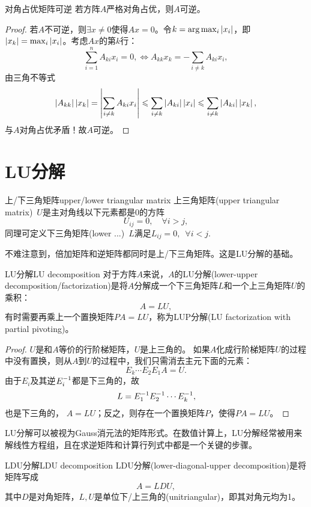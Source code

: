 \begin{theorem}
	{对角占优矩阵可逆}{}
	若方阵$A$严格对角占优，则$A$可逆。
\end{theorem}

\begin{proof}
	若$A$不可逆，则$\exists x\neq 0$使得$Ax=0$。令$k=\arg\max_i\left\lvert x_i\right\rvert$，即$\left\lvert x_k\right\rvert=\max_i\left\lvert x_i\right\rvert$。考虑$Ax$的第$k$行：
	\[
		\sum_{i=1}^nA_{ki}x_i=0,\iff A_{kk}x_k=-\sum_{i\neq k}A_{ki}x_i,
	\]
	由三角不等式
	\[
		\left\lvert A_{kk}\right\rvert\left\lvert x_k\right\rvert=\left\lvert\sum_{i\neq k}A_{ki}x_i\right\rvert\leqslant\sum_{i\neq k}\left\lvert A_{ki}\right\rvert\left\lvert x_i\right\rvert\leqslant\sum_{i\neq k}\left\lvert A_{ki}\right\rvert\left\lvert x_k\right\rvert,
	\]
	与$A$对角占优矛盾！故$A$可逆。
\end{proof}

\section{LU分解}

\begin{definition}{上/下三角矩阵}{upper/lower triangular matrix}
	上三角矩阵(upper triangular matrix)~$U$是主对角线以下元素都是0的方阵
	\[
		U_{ij}=0,\quad\forall i>j,
	\]
	同理可定义下三角矩阵(lower ...)~$L$满足$L_{ij}=0,\enspace\forall i<j.$
\end{definition}
不难注意到，倍加矩阵和逆矩阵都同时是上/下三角矩阵。这是LU分解的基础。
\begin{theorem}{LU分解}{LU decomposition}
	对于方阵$A$来说，$A$的LU分解(lower-upper decomposition/factorization)是将$A$分解成一个下三角矩阵$L$和一个上三角矩阵$U$的乘积：
	\begin{equation}
		A=LU,
	\end{equation}
	有时需要再乘上一个置换矩阵$PA=LU$，称为LUP分解(LU factorization with partial pivoting)。
\end{theorem}
\begin{proof}
	$U$是和$A$等价的行阶梯矩阵，$U$是上三角的。
	如果$A$化成行阶梯矩阵$U$的过程中没有置换，则从$A$到$U$的过程中，我们只需消去主元下面的元素：
	\[
		E_k\cdots E_2E_1A=U.
	\]
	由于$E_i$及其逆$E_i^{-1}$都是下三角的，故
	\[
		L=E_1^{-1} E_2^{-1}\cdots E_k^{-1},
	\]
	也是下三角的，%
	$A=LU$；反之，则存在一个置换矩阵$P$，使得$PA=LU$。
\end{proof}

\begin{remark}
	LU分解可以被视为Gauss消元法的矩阵形式。在数值计算上，LU分解经常被用来解线性方程组，且在求逆矩阵和计算行列式中都是一个关键的步骤。
\end{remark}

\begin{theorem}
	{LDU分解}{LDU decomposition}
	LDU分解(lower-diagonal-upper decomposition)是将矩阵写成
	\[
		A=LDU,
	\]
	其中$D$是对角矩阵，$L,U$是单位下/上三角的(unitriangular)，即其对角元均为1。
\end{theorem}

